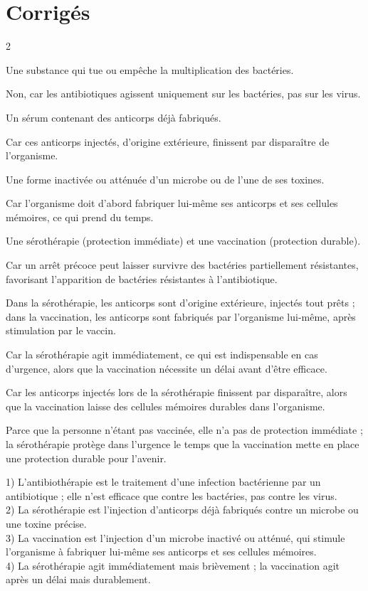 \section{Corrigés}
\begin{multicols}{2}

Une substance qui tue ou empêche la multiplication des bactéries.

Non, car les antibiotiques agissent uniquement sur les bactéries, pas sur les virus.

Un sérum contenant des anticorps déjà fabriqués.

Car ces anticorps injectés, d'origine extérieure, finissent par disparaître de
l'organisme.

Une forme inactivée ou atténuée d'un microbe ou de l'une de ses toxines.

Car l'organisme doit d'abord fabriquer lui-même ses anticorps et ses cellules
mémoires, ce qui prend du temps.

Une sérothérapie (protection immédiate) et une vaccination (protection durable).

Car un arrêt précoce peut laisser survivre des bactéries partiellement résistantes,
favorisant l'apparition de bactéries résistantes à l'antibiotique.

Dans la sérothérapie, les anticorps sont d'origine extérieure, injectés tout prêts ;
dans la vaccination, les anticorps sont fabriqués par l'organisme lui-même, après
stimulation par le vaccin.

Car la sérothérapie agit immédiatement, ce qui est indispensable en cas d'urgence, alors
que la vaccination nécessite un délai avant d'être efficace.

Car les anticorps injectés lors de la sérothérapie finissent par disparaître, alors
que la vaccination laisse des cellules mémoires durables dans l'organisme.

Parce que la personne n'étant pas vaccinée, elle n'a pas de protection immédiate ; la
sérothérapie protège dans l'urgence le temps que la vaccination mette en place une
protection durable pour l'avenir.

1) L'antibiothérapie est le traitement d'une infection bactérienne par un
antibiotique ; elle n'est efficace que contre les bactéries, pas contre les virus.\\
2) La sérothérapie est l'injection d'anticorps déjà fabriqués contre un microbe ou une
toxine précise.\\
3) La vaccination est l'injection d'un microbe inactivé ou atténué, qui stimule
l'organisme à fabriquer lui-même ses anticorps et ses cellules mémoires.\\
4) La sérothérapie agit immédiatement mais brièvement ; la vaccination agit après un
délai mais durablement.


\end{multicols}
